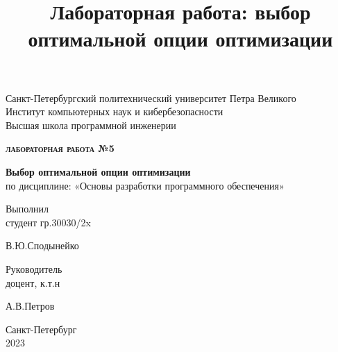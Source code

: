 \documentclass[a4paper, 12pt] {article}
\title{Лабораторная работа: выбор оптимальной опции оптимизации}
\begin{document}

\thispagestyle{empty}                   %

\begin{center}
   Санкт-Петербургский политехнический университет Петра Великого\\
   Институт компьютерных наук и кибербезопасности\\
   Высшая школа программной инженерии
\end{center}

\vspace{20ex}                %

\begin{center}
   \begin{LARGE}
     {\bfseries{\scshape лабораторная работа №5}}
   \end{LARGE}

   \vspace{3ex}

   \begin{large}
     {\bfseries Выбор оптимальной опции оптимизации\\}
   по дисциплине: «Основы разработки программного обеспечения»
   \end{large}
\end{center}

\vspace{30ex}

\noindent Выполнил\\
студент гр.30030/2x \hfill \begin{minipage}{0.6\textwidth}\hfill
  В.Ю.Сподынейко\end{minipage}

\vspace{3ex}

\noindent Руководитель\\
доцент, к.т.н\hfill \begin{minipage} {0.6\textwidth}\hfill
  А.В.Петров\end{minipage}

\vfill

\begin{center}
   Санкт-Петербург\\
   2023
\end{center}

\newpage
\tableofcontents
\end{document}
